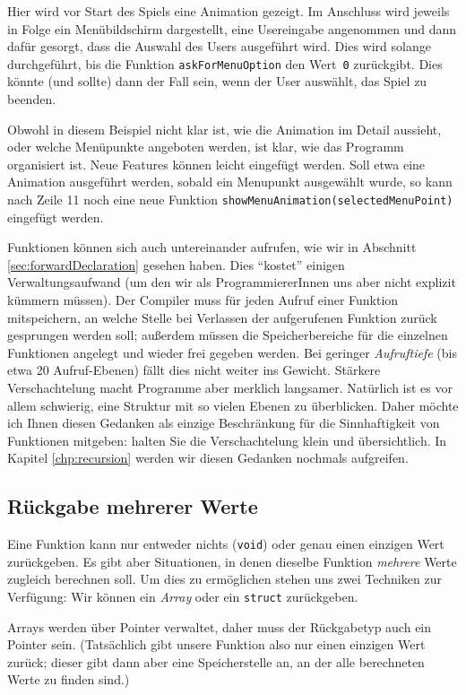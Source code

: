 Hier wird vor Start des Spiels eine Animation gezeigt. Im Anschluss wird jeweils in Folge ein Menü\-bildschirm dargestellt, eine Usereingabe angenommen und dann dafür gesorgt, dass die Auswahl des Users ausgeführt wird. Dies wird solange durchgeführt, bis die Funktion \texttt{askForMenuOption} den Wert~\texttt{0} zurückgibt. Dies könnte (und sollte) \eg dann der Fall sein, wenn der User auswählt, das Spiel zu beenden.

Obwohl in diesem Beispiel nicht klar ist, wie die Animation im Detail aussieht, oder welche Menüpunkte angeboten werden, ist klar, wie das Programm organisiert ist. Neue Features können leicht eingefügt werden. Soll etwa eine Animation ausgeführt werden, sobald ein Menupunkt ausgewählt wurde, so kann nach Zeile 11 noch eine neue Funktion \texttt{showMenuAnimation(selectedMenuPoint)} eingefügt werden.

Funktionen können sich auch untereinander aufrufen, wie wir in Abschnitt \ref{sec:forwardDeclaration} gesehen haben. Dies \enquote{kostet} einigen Verwaltungsaufwand (um den wir als ProgrammiererInnen uns aber nicht explizit kümmern müssen). Der Compiler muss für jeden Aufruf einer Funktion mitspeichern, an welche Stelle bei Verlassen der aufgerufenen Funktion zurück gesprungen werden soll; außerdem müssen die Speicherbereiche für die einzelnen Funktionen angelegt und wieder frei gegeben werden. Bei geringer \emph{Aufruftiefe} (bis etwa 20 Aufruf-Ebenen) fällt dies nicht weiter ins Gewicht. Stärkere Verschachtelung macht Programme aber merklich langsamer. Natürlich ist es vor allem schwierig, eine Struktur mit so vielen Ebenen zu überblicken. Daher möchte ich Ihnen diesen Gedanken als einzige Beschränkung für die Sinnhaftigkeit von Funktionen mitgeben: halten Sie die Verschachtelung klein und übersichtlich. In Kapitel \ref{chp:recursion} werden wir diesen Gedanken nochmals aufgreifen.

\subsection{Rückgabe mehrerer Werte}
Eine Funktion kann nur entweder nichts (\texttt{void}) oder genau einen einzigen Wert zurückgeben. Es gibt aber Situationen, in denen dieselbe Funktion \emph{mehrere} Werte zugleich berechnen soll. Um dies zu ermöglichen stehen uns zwei Techniken zur Verfügung: Wir können ein \emph{Array} oder ein \texttt{struct} zurückgeben.

Arrays werden über Pointer verwaltet, daher muss der Rückgabetyp auch ein Pointer sein. (Tatsächlich gibt unsere Funktion also nur einen einzigen Wert zurück; dieser gibt dann aber eine Speicherstelle an, an der alle berechneten Werte zu finden sind.)

